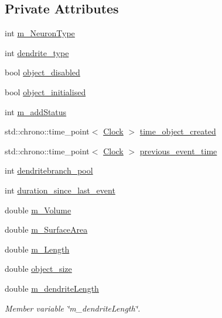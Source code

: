\subsection*{Private Attributes}
\begin{DoxyCompactItemize}
\item 
int \mbox{\hyperlink{classDendrite_a1b29ae9a6ebd1cd8a329f29b11082291}{m\+\_\+\+Neuron\+Type}}
\item 
int \mbox{\hyperlink{classDendrite_a36925227bc081b318cc788b5cad78dc9}{dendrite\+\_\+type}}
\item 
bool \mbox{\hyperlink{classDendrite_ae34d0c5b775380e4fd91b697b19b4cd0}{object\+\_\+disabled}}
\item 
bool \mbox{\hyperlink{classDendrite_abf7b861f7b322d580e02fcf238fcc1a0}{object\+\_\+initialised}}
\item 
int \mbox{\hyperlink{classDendrite_a39a1f37070a1f3e0c90fdc2c54ca9bab}{m\+\_\+add\+Status}}
\item 
std\+::chrono\+::time\+\_\+point$<$ \mbox{\hyperlink{universe_8h_a0ef8d951d1ca5ab3cfaf7ab4c7a6fd80}{Clock}} $>$ \mbox{\hyperlink{classDendrite_a21584e5b60195738546123a9ba3c2d6f}{time\+\_\+object\+\_\+created}}
\item 
std\+::chrono\+::time\+\_\+point$<$ \mbox{\hyperlink{universe_8h_a0ef8d951d1ca5ab3cfaf7ab4c7a6fd80}{Clock}} $>$ \mbox{\hyperlink{classDendrite_ae4a39c5f211f908eabff9fdd35247f05}{previous\+\_\+event\+\_\+time}}
\item 
int \mbox{\hyperlink{classDendrite_ab5b135965667e18b4bd0ff7ef2cd2cc8}{dendritebranch\+\_\+pool}}
\item 
int \mbox{\hyperlink{classDendrite_ade514098e64a0f8a4061e1efbd1eda1d}{duration\+\_\+since\+\_\+last\+\_\+event}}
\item 
double \mbox{\hyperlink{classDendrite_a703375fe869320642bc6461888a42fb5}{m\+\_\+\+Volume}}
\item 
double \mbox{\hyperlink{classDendrite_a72259a619c9c3224c2779117be2c9695}{m\+\_\+\+Surface\+Area}}
\item 
double \mbox{\hyperlink{classDendrite_a733dcd2b9f524a964fc2276f2022bfbb}{m\+\_\+\+Length}}
\item 
double \mbox{\hyperlink{classDendrite_a33352f43679858316c6e1c92a4a71264}{object\+\_\+size}}
\item 
double \mbox{\hyperlink{classDendrite_ad08f503df19e5c3816340aba41351087}{m\+\_\+dendrite\+Length}}
\begin{DoxyCompactList}\small\item\em Member variable \char`\"{}m\+\_\+dendrite\+Length\char`\"{}. \end{DoxyCompactList}\item 

\end{DoxyCompactItemize}
